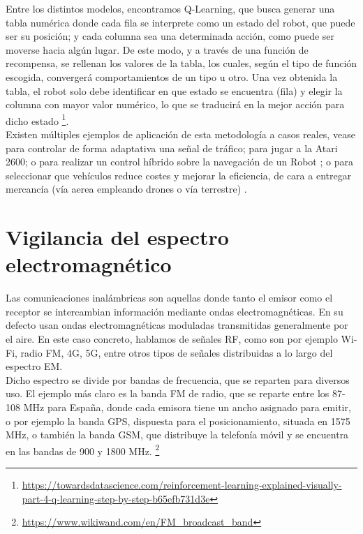 Entre los distintos modelos, encontramos Q-Learning, que busca generar una tabla numérica donde cada fila se interprete como un estado del robot, que puede ser su posición; y cada columna sea una determinada acción, como puede ser moverse hacia algún lugar. De este modo, y a través de una función de recompensa, se rellenan los valores de la tabla, los cuales, según el tipo de función escogida, convergerá comportamientos de un tipo u otro. Una vez obtenida la tabla, el robot solo debe identificar en que estado se encuentra (fila) y elegir la columna con mayor valor numérico, lo que se traducirá en la mejor acción para dicho estado \footnote[20]{\url{https://towardsdatascience.com/reinforcement-learning-explained-visually-part-4-q-learning-step-by-step-b65efb731d3e}}.\\

Existen múltiples ejemplos de aplicación de esta metodología a casos reales, vease para controlar de forma adaptativa una señal de tráfico; para jugar a la Atari 2600; o para realizar un control híbrido sobre la navegación de un Robot \cite{q-learning-app}; o para seleccionar que vehículos reduce costes y mejorar la eficiencia, de cara a entregar mercancía (vía aerea empleando drones o vía terrestre) \cite{CHEN2022939}.

\section{Vigilancia del espectro electromagnético}
\label{subsec:señales}

Las comunicaciones inalámbricas son aquellas donde tanto el emisor como el receptor se intercambian información mediante ondas electromagnéticas. En su defecto usan ondas electromagnéticas moduladas transmitidas generalmente por el aire. En este caso concreto, hablamos de señales \ac{RF}, como son por ejemplo Wi-Fi, radio FM, 4G, 5G, entre otros tipos de señales distribuidas a lo largo del espectro \ac{EM}.\\

Dicho espectro se divide por bandas de frecuencia, que se reparten para diversos uso. El ejemplo más claro es la banda FM de radio, que se reparte entre los 87-108 MHz para España, donde cada emisora tiene un ancho asignado para emitir, o por ejemplo la banda GPS, dispuesta para el posicionamiento, situada en 1575 MHz, o también la banda GSM, que distribuye la telefonía móvil y se encuentra en las bandas de 900 y 1800 MHz. \footnote[21]{\url{https://www.wikiwand.com/en/FM_broadcast_band}}\\

